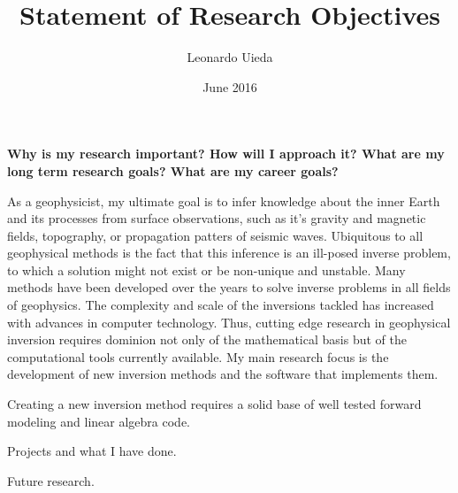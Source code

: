 \documentclass[12pt]{article}
\title{\textbf{Statement of Research Objectives}}
\author{Leonardo Uieda}
\date{June 2016}
\begin{document}
\maketitle


\textbf{Why is my research important?
How will I approach it?
What are my long term research goals?
What are my career goals?}

As a geophysicist,
my ultimate goal is
to infer knowledge about the inner Earth
and its processes
from surface observations,
such as it's gravity and magnetic fields,
topography,
or propagation patters of seismic waves.
%
Ubiquitous to all geophysical methods is
the fact that this inference is
an ill-posed inverse problem,
to which a solution might not exist or be non-unique and unstable.
%
Many methods have been developed over the years
to solve inverse problems
in all fields of geophysics.
%
The complexity and scale of
the inversions tackled has increased
with advances in computer technology.
%
Thus,
cutting edge research
in geophysical inversion
requires dominion not only of the mathematical basis
but of the computational tools currently available.
%
My main research focus is
the development of new inversion methods
and the software that implements them.


Creating a new inversion method
requires a solid base of well tested
forward modeling and linear algebra code.
%




Projects and what I have done.

Future research.
\end{document}
